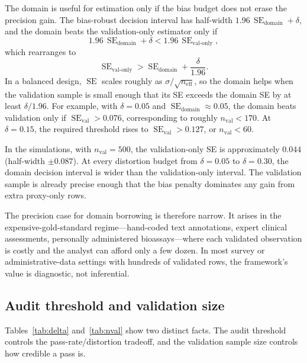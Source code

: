 \documentclass[11pt]{article}
\newcommand{\SE}{\operatorname{SE}}
\newcommand{\1}{\mathbf{1}}
\begin{document}
The domain is useful for estimation only if the bias budget does not erase the precision gain. The bias-robust decision interval has half-width $1.96\,\SE_{\mathrm{domain}}+\delta$, and the domain beats the validation-only estimator only if
\[
1.96\,\SE_{\mathrm{domain}}+\delta < 1.96\,\SE_{\mathrm{val\text{-}only}},
\]
which rearranges to
\[
\SE_{\mathrm{val\text{-}only}} > \SE_{\mathrm{domain}} + \frac{\delta}{1.96}.
\]
In a balanced design, $\SE$ scales roughly as $\sigma/\sqrt{n_{\mathrm{eff}}}$, so the domain helps when the validation sample is small enough that its SE exceeds the domain SE by at least $\delta/1.96$. For example, with $\delta=0.05$ and $\SE_{\mathrm{domain}}\approx 0.05$, the domain beats validation only if $\SE_{\mathrm{val}}>0.076$, corresponding to roughly $n_{\mathrm{val}}<170$. At $\delta=0.15$, the required threshold rises to $\SE_{\mathrm{val}}>0.127$, or $n_{\mathrm{val}}<60$.

In the simulations, with $n_{\mathrm{val}}=500$, the validation-only SE is approximately $0.044$ (half-width $\pm 0.087$). At every distortion budget from $\delta=0.05$ to $\delta=0.30$, the domain decision interval is wider than the validation-only interval. The validation sample is already precise enough that the bias penalty dominates any gain from extra proxy-only rows.

The precision case for domain borrowing is therefore narrow. It arises in the expensive-gold-standard regime---hand-coded text annotations, expert clinical assessments, personally administered bioassays---where each validated observation is costly and the analyst can afford only a few dozen. In most survey or administrative-data settings with hundreds of validated rows, the framework's value is diagnostic, not inferential.

\subsection{Audit threshold and validation size}

Tables~\ref{tab:delta} and~\ref{tab:nval} show two distinct facts. The audit threshold controls the pass-rate/distortion tradeoff, and the validation sample size controls how credible a pass is.
\end{document}
